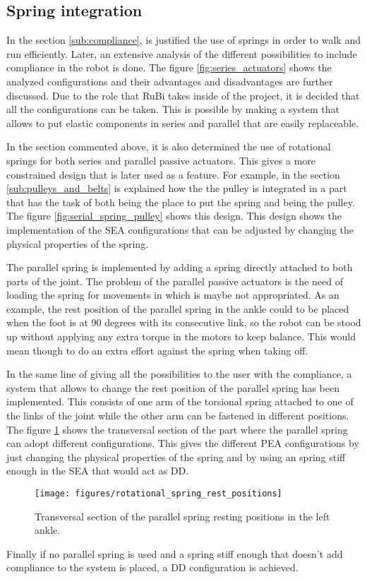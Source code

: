 \subsection{Spring integration} %
\label{sub:spring_integration}
In the section \ref{sub:compliance}, is justified the use of springs in order to walk and run efficiently. 
Later, an extensive analysis of the different possibilities to include compliance in the robot is done.
The figure \ref{fig:series_actuators} shows the analyzed configurations and their advantages and disadvantages are further discussed.
Due to the role that RuBi takes inside of the project, it is decided that all the configurations can be taken.
This is possible by making a system that allows to put elastic components in series and parallel that are easily replaceable.

In the section commented above, it is also determined the use of rotational springs for both series and parallel passive actuators.
This gives a more constrained design that is later used as a feature.
For example, in the section \ref{sub:pulleys_and_belts} is explained how the the pulley is integrated in a part that has the task of both being the place to put the spring and being the pulley.
The figure \ref{fig:serial_spring_pulley} shows this design.
This design shows the implementation of the SEA configurations that can be adjusted by changing the physical properties of the spring.

The parallel spring is implemented by adding a spring directly attached to both parts of the joint.
The problem of the parallel passive actuators is the need of loading the spring for movements in which is maybe not appropriated.
As an example, the rest position of the parallel spring in the ankle could to be placed when the foot is at 90 degrees with its consecutive link, so the robot can be stood up without applying any extra torque in the motors to keep balance.
This would mean though to do an extra effort against the spring when taking off.

In the same line of giving all the possibilities to the user with the compliance, a system that allows to change the rest position of the parallel spring has been implemented.
This consists of one arm of the torsional spring attached to one of the links of the joint while the other arm can be fastened in different positions.
The figure \ref{fig:rotational_spring_rest_position} shows the transversal section of the part where the parallel spring can adopt different configurations. 
This gives the different PEA configurations by just changing the physical properties of the spring and by using an spring stiff enough in the SEA that would act as DD.

\begin{figure}[ht!]
	\centering
	\texttt{[image: figures/rotational\_spring\_rest\_positions]}
	\caption{Transversal section of the parallel spring resting positions in the left ankle.}
	\label{fig:rotational_spring_rest_position}
\end{figure}

Finally if no parallel spring is used and a spring stiff enough that doesn't add compliance to the system is placed, a DD configuration is achieved.
